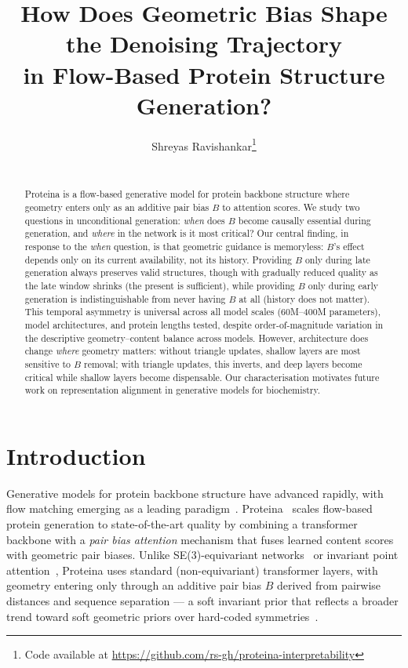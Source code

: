 \documentclass{article}
\title[Geometric Bias in Flow-Based Protein Structure Generation]{How Does Geometric Bias Shape the Denoising Trajectory\\
in Flow-Based Protein Structure Generation?}
\author[S. Ravishankar]{Shreyas Ravishankar\thanks{Code available at \url{https://github.com/rs-gh/proteina-interpretability}}\\
\institute{University of Cambridge}\\
\email{sr2173@cam.ac.uk}}
\begin{document}
\maketitle

\begin{abstract}
Proteina is a flow-based generative model for protein backbone structure where geometry enters only as an additive pair bias $B$ to attention scores.
We study two questions in unconditional generation: \emph{when} does $B$ become causally essential during generation, and \emph{where} in the network is it most critical?
Our central finding, in response to the \emph{when} question, is that geometric guidance is memoryless: $B$'s effect depends only on its current availability, not its history. Providing $B$ only during late generation always preserves valid structures, though with gradually reduced quality as the late window shrinks (the present is sufficient), while providing $B$ only during early generation is indistinguishable from never having $B$ at all (history does not matter).
This temporal asymmetry is universal across all model scales (60M--400M parameters), model architectures, and protein lengths tested, despite order-of-magnitude variation in the descriptive geometry--content balance across models.
However, architecture does change \emph{where} geometry matters: without triangle updates, shallow layers are most sensitive to $B$ removal; with triangle updates, this inverts, and deep layers become critical while shallow layers become dispensable.
Our characterisation motivates future work on representation alignment in generative models for biochemistry.
\end{abstract}

\section{Introduction}

Generative models for protein backbone structure have advanced rapidly, with flow matching emerging as a leading paradigm~\citep{lipman2023flow}.
Proteina~\citep{geffner2025proteina} scales flow-based protein generation to state-of-the-art quality by combining a transformer backbone with a \emph{pair bias attention} mechanism that fuses learned content scores with geometric pair biases.
Unlike SE(3)-equivariant networks~\citep{thomas2018tensor,fuchs2020se3} or invariant point attention~\citep{jumper2021alphafold2}, Proteina uses standard (non-equivariant) transformer layers, with geometry entering only through an additive pair bias $B$ derived from pairwise distances and sequence separation --- a soft invariant prior that reflects a broader trend toward soft geometric priors over hard-coded symmetries~\citep{dosovitskiy2021image,kim2022tokengt,abramson2024alphafold3}.
\end{document}
